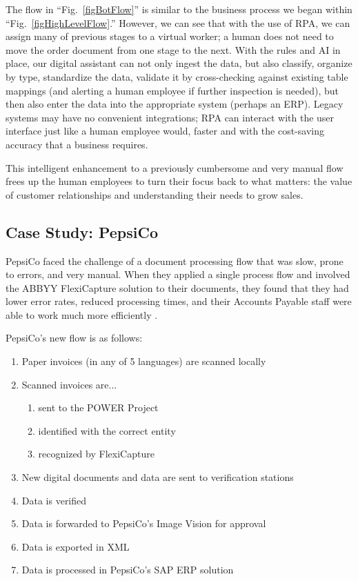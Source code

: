 \documentclass[conference]{IEEEtran}
\begin{document}
The flow in ``Fig.~\ref{figBotFlow}'' is similar to the business process we began within ``Fig.~\ref{figHighLevelFlow}.'' However, we can see that with the use of RPA, we can assign many of previous stages to a virtual worker; a human does not need to move the order document from one stage to the next. With the rules and AI in place, our digital assistant can not only ingest the data, but also classify, organize by type, standardize the data, validate it by cross-checking against existing table mappings (and alerting a human employee if further inspection is needed), but then also enter the data into the appropriate system (perhaps an ERP). Legacy systems may have no convenient integrations; RPA can interact with the user interface just like a human employee would, faster and with the cost-saving accuracy that a business requires.

This intelligent enhancement to a previously cumbersome and very manual flow frees up the human employees to turn their focus back to what matters: the value of customer relationships and understanding their needs to grow sales.

\subsection{Case Study: PepsiCo}
PepsiCo faced the challenge of a document processing flow that was slow, prone to errors, and very manual. When they applied a single process flow and involved the ABBYY FlexiCapture solution to their documents, they found that they had lower error rates, reduced processing times, and their Accounts Payable staff were able to work much more efficiently \cite{pepsico}.

PepsiCo's new flow is as follows:
\begin{enumerate}
\item Paper invoices (in any of 5 languages) are scanned locally
\item Scanned invoices are...
    \begin{enumerate}
        \item sent to the POWER Project
        \item identified with the correct entity
        \item recognized by FlexiCapture
    \end{enumerate}
\item New digital documents and data are sent to verification stations
\item Data is verified
\item Data is forwarded to PepsiCo's Image Vision for approval
\item Data is exported in XML
\item Data is processed in PepsiCo's SAP ERP solution
\end{enumerate}
\end{document}
